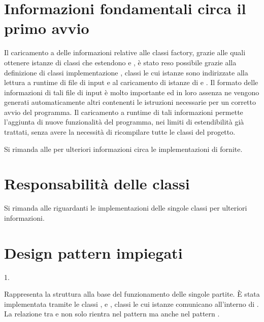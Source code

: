 \documentclass[letterpaper,10pt,italian,openany,oneside]{sphinxmanual}
\begin{document}
\section{Informazioni fondamentali circa il primo avvio}
\label{\detokenize{introduzione:informazioni-fondamentali-circa-il-primo-avvio}}
Il caricamento a  delle informazioni relative alle classi factory, grazie alle quali ottenere istanze di classi che estendono
 e , è stato reso possibile grazie alla definizione di classi implementazione , classi le cui istanze sono indirizzate
alla lettura a runtime di file di input e al caricamento di istanze di  e .
Il formato delle informazioni di tali file di input è molto importante ed in loro assenza ne vengono generati automaticamente altri
 contenenti le istruzioni necessarie per un corretto avvio del programma.
Il caricamento a runtime di tali informazioni permette l’aggiunta di nuove funzionalità del programma, nei limiti di estendibilità già trattati, senza avere la
necessità di ricompilare tutte le classi del progetto.

Si rimanda alle {\hyperref[\detokenize{source/packages::doc}]{}} per ulteriori informazioni circa le implementazioni di  fornite.


\section{Responsabilità delle classi}
\label{\detokenize{introduzione:responsabilita-delle-classi}}
Si rimanda alle {\hyperref[\detokenize{source/packages::doc}]{}} riguardanti le implementazioni delle singole classi per ulteriori informazioni.


\section{Design pattern impiegati}
\label{\detokenize{introduzione:design-pattern-impiegati}}
1.  %
\begin{footnote}[2]\sphinxAtStartFootnote
{}
%
\end{footnote}
Rappresenta la struttura alla base del funzionamento delle singole partite.
È stata implementata tramite le classi ,  e , classi le cui istanze comunicano all’interno di .
La relazione tra  e  non solo rientra nel pattern  ma anche nel pattern .
\end{document}
